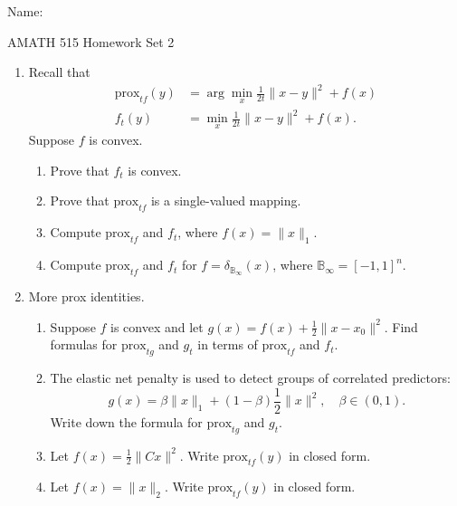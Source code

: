 \documentclass[11pt]{amsart}
\newcommand{\prox}{\mathrm{prox}}
\begin{document}
{\Large Name:}  \\
\begin{center}
\Large AMATH 515 \hskip 2in Homework Set 2\\
\end{center}
\vskip 32pt

\begin{enumerate}



\item Recall that 
\[
\begin{aligned}
\mbox{prox}_{t f}(y) &= \arg\min_{x} \frac{1}{2t}\|x-y\|^2 + f(x)\\
f_t(y) &= \min_x \frac{1}{2t}\|x-y\|^2 + f(x).
\end{aligned}
\] 
Suppose $f$ is convex. 
\vskip 16pt
\begin{enumerate}

\item Prove that $f_t$ is convex.  
\bigskip

\item Prove that $\prox_{t f}$ is a single-valued mapping. 
\bigskip

\item Compute $\prox_{t f}$ and $f_t$, where $f(x) = \|x\|_1$. 
\bigskip
\item Compute $\prox_{t f}$ and $f_t$ for $f = \delta_{\mathbb{B}_{\infty}}(x)$, 
where $\mathbb{B}_\infty = [-1,1]^n$.

\bigskip
\end{enumerate}

\vskip 32pt

\item More prox identities. 
\vskip 16pt
\begin{enumerate}

\item Suppose $f$ is convex and let $g(x) = f(x) + \frac{1}{2}\|x-x_0\|^2$. 
Find formulas for $\prox_{t g}$ and $g_t$ in terms of $\prox_{t f}$ and $f_t$.
\bigskip

\item The elastic net penalty is used to detect groups of correlated predictors:
\[
g(x) = \beta \|x\|_1 + (1-\beta) \frac{1}{2}\|x\|^2, \quad \beta \in (0,1).
\] 
Write down the formula for $\prox_{t g}$ and $g_t$.
\bigskip

\item Let $f(x) = \frac{1}{2}\|Cx\|^2$. Write $\prox_{t f}(y)$ in closed form.

\bigskip

\item Let $f(x) = \|x\|_2$. Write $\prox_{tf}(y)$ in closed form.

\end{enumerate}
\end{enumerate}

\vskip 32pt

\bigskip



\bigskip\bigskip
\end{document}
